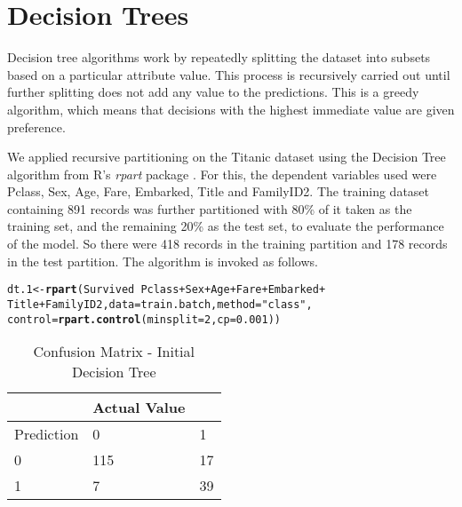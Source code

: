 \documentclass[a4paper,10pt]{report}\usepackage[]{graphicx}\usepackage[]{color}
\makeatletter
\newcommand{\hlnum}[1]{\textcolor[rgb]{0.686,0.059,0.569}{#1}}%
\newcommand{\hlstr}[1]{\textcolor[rgb]{0.192,0.494,0.8}{#1}}%
\newcommand{\hlopt}[1]{\textcolor[rgb]{0,0,0}{#1}}%
\newcommand{\hlstd}[1]{\textcolor[rgb]{0.345,0.345,0.345}{#1}}%
\newcommand{\hlkwb}[1]{\textcolor[rgb]{0.69,0.353,0.396}{#1}}%
\newcommand{\hlkwc}[1]{\textcolor[rgb]{0.333,0.667,0.333}{#1}}%
\newcommand{\hlkwd}[1]{\textcolor[rgb]{0.737,0.353,0.396}{\textbf{#1}}}%
\newenvironment{kframe}{%
 \def\at@end@of@kframe{}%
 \ifinner\ifhmode%
  \def\at@end@of@kframe{\end{minipage}}%
  \begin{minipage}{\columnwidth}%
 \fi\fi%
 \def\FrameCommand##1{\hskip\@totalleftmargin \hskip-\fboxsep
 \colorbox{shadecolor}{##1}\hskip-\fboxsep
     \hskip-\linewidth \hskip-\@totalleftmargin \hskip\columnwidth}%
 \MakeFramed {\advance\hsize-\width
   \@totalleftmargin\z@ \linewidth\hsize
   \@setminipage}}%
 {\par\unskip\endMakeFramed%
 \at@end@of@kframe}
\newenvironment{knitrout}{}{} %
\makeatother
\begin{document}
\section{Decision Trees}
Decision tree algorithms work by repeatedly splitting the dataset into subsets based on a particular attribute value. This process is recursively carried out until further splitting does not add any value to the predictions. This is a greedy algorithm, which means that decisions with the highest immediate value are given preference.

We applied recursive partitioning on the Titanic dataset using the Decision Tree algorithm from R's \emph{rpart} package . For this, the dependent variables used were Pclass, Sex, Age, Fare, Embarked, Title and FamilyID2. The training dataset containing 891 records was further partitioned with 80\% of it taken as the training set, and the remaining 20\% as the test set, to evaluate the performance of the model. So there were 418 records in the training partition and 178 records in the test partition. The algorithm is invoked as follows.
\begin{knitrout}
\color{fgcolor}\begin{kframe}
\begin{alltt}
\hlstd{dt.1} \hlkwb{<-} \hlkwd{rpart}\hlstd{(Survived} \hlopt{~} \hlstd{Pclass} \hlopt{+} \hlstd{Sex} \hlopt{+} \hlstd{Age} \hlopt{+} \hlstd{Fare} \hlopt{+} \hlstd{Embarked} \hlopt{+}
    \hlstd{Title} \hlopt{+} \hlstd{FamilyID2,} \hlkwc{data} \hlstd{= train.batch,} \hlkwc{method} \hlstd{=} \hlstr{"class"}\hlstd{,}
    \hlkwc{control} \hlstd{=} \hlkwd{rpart.control}\hlstd{(}\hlkwc{minsplit} \hlstd{=} \hlnum{2}\hlstd{,} \hlkwc{cp} \hlstd{=} \hlnum{0.001}\hlstd{))}
\end{alltt}
\end{kframe}
\end{knitrout}


\begin{table}
    \begin{tabular}{|l|l|l|}
    \hline
    ~          & Actual Value  & ~  \\ \hline
    Prediction & 0             & 1  \\ \hline
    0          & 115           & 17 \\
    1          & 7             & 39 \\ \hline
    \end{tabular}
    \caption{Confusion Matrix - Initial Decision Tree}
\end{table}
\end{document}
